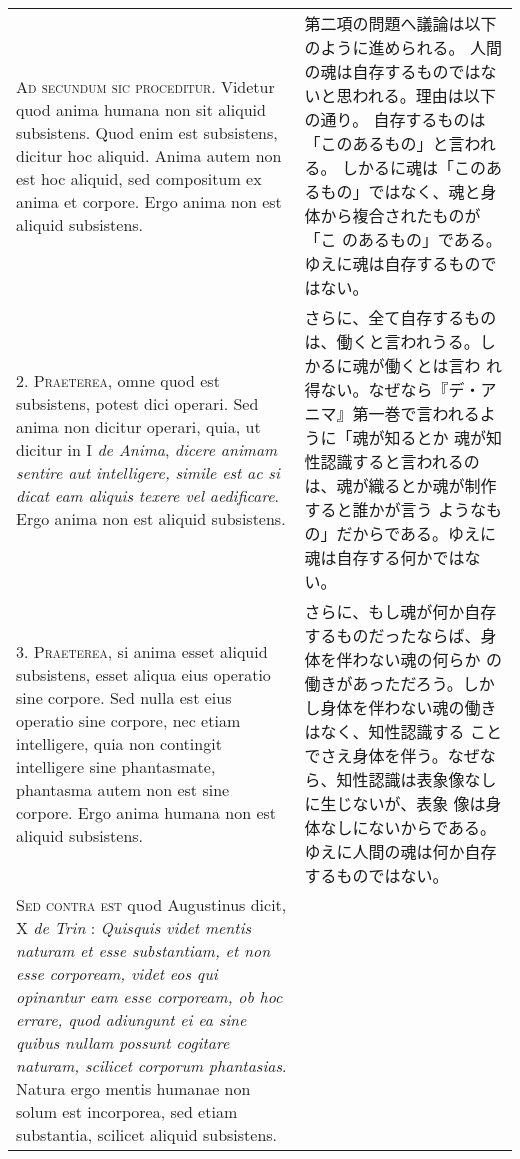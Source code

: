 \documentclass[10pt]{jsarticle} %
\begin{document}
\begin{longtable}{p{21em}p{21em}}



{\scshape Ad secundum sic proceditur}. Videtur quod anima humana non sit aliquid
subsistens. Quod enim est subsistens, dicitur hoc aliquid. Anima autem
non est hoc aliquid, sed compositum ex anima et corpore. Ergo anima
non est aliquid subsistens.


&

第二項の問題へ議論は以下のように進められる。
人間の魂は自存するものではないと思われる。理由は以下の通り。
自存するものは「このあるもの」と言われる。
しかるに魂は「このあるもの」ではなく、魂と身体から複合されたものが「こ
 のあるもの」である。ゆえに魂は自存するものではない。

\\



2. {\scshape Praeterea}, omne quod est subsistens, potest dici operari. Sed anima
non dicitur operari, quia, ut dicitur in I {\itshape de Anima}, {\itshape dicere animam
sentire aut intelligere, simile est ac si dicat eam aliquis texere vel
aedificare}. Ergo anima non est aliquid subsistens.


&

さらに、全て自存するものは、働くと言われうる。しかるに魂が働くとは言わ
 れ得ない。なぜなら『デ・アニマ』第一巻で言われるように「魂が知るとか
 魂が知性認識すると言われるのは、魂が織るとか魂が制作すると誰かが言う
 ようなもの」だからである。ゆえに魂は自存する何かではない。

\\



3. {\scshape Praeterea}, si anima esset aliquid subsistens, esset aliqua eius
operatio sine corpore. Sed nulla est eius operatio sine corpore, nec
etiam intelligere, quia non contingit intelligere sine phantasmate,
phantasma autem non est sine corpore. Ergo anima humana non est
aliquid subsistens.


&

さらに、もし魂が何か自存するものだったならば、身体を伴わない魂の何らか
の働きがあっただろう。しかし身体を伴わない魂の働きはなく、知性認識する
ことでさえ身体を伴う。なぜなら、知性認識は表象像なしに生じないが、表象
像は身体なしにないからである。ゆえに人間の魂は何か自存するものではない。

\\



{\scshape Sed contra est} quod Augustinus dicit, X {\itshape de Trin} : {\itshape Quisquis videt mentis
naturam et esse substantiam, et non esse corpoream, videt eos qui
opinantur eam esse corpoream, ob hoc errare, quod adiungunt ei ea sine
quibus nullam possunt cogitare naturam, scilicet corporum
phantasias}. Natura ergo mentis humanae non solum est incorporea, sed
etiam substantia, scilicet aliquid subsistens.



\end{longtable}
\end{document}
